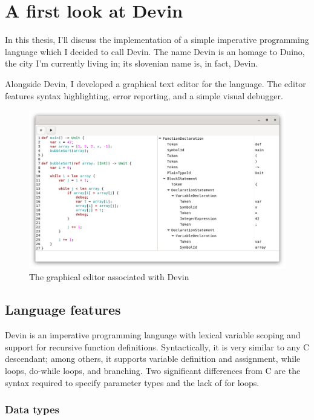 \documentclass[11pt, american, draft]{PhdThesis}
\begin{document}
  \chapter{A first look at Devin}

  In this thesis, I'll discuss the implementation of a simple imperative programming language which
  I decided to call Devin. The name Devin is an homage to Duino, the city I'm currently living in;
  its slovenian name is, in fact, Devin.

  Alongside Devin, I developed a graphical text editor for the language. The editor features syntax
  highlighting, error reporting, and a simple visual debugger.

  \begin{figure}[H]
    \centering
    \includegraphics[width=0.9\linewidth]{2.png}
    \caption{The graphical editor associated with Devin}
    \label{ex1}
  \end{figure}

  \section{Language features}

  Devin is an imperative programming language with lexical variable scoping and support for
  recursive function definitions. Syntactically, it is very similar to any C descendant; among
  others, it supports variable definition and assignment, while loops, do-while loops, and
  branching. Two significant differences from C are the syntax required to specify parameter types
  and the lack of for loops.

  \subsection{Data types}
\end{document}
